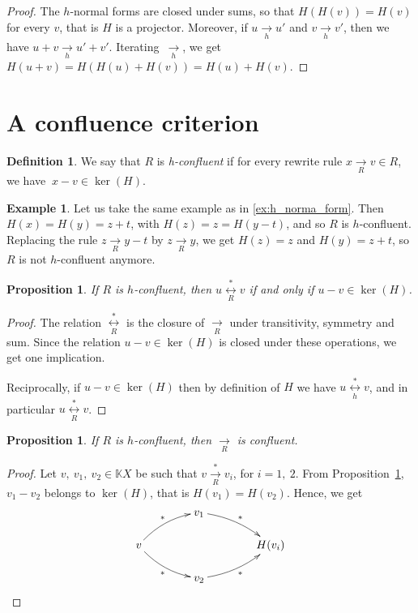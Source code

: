 \documentclass[10pt]{easychair}
\newtheorem{proposition}[theorem]{Proposition}
\theoremstyle{definition}
\newtheorem{definition}[theorem]{Definition}
\newtheorem{example}[theorem]{Example}
\newcommand\K{\mathbb{K}}
\newcommand\KX{\K X}
\newcommand\rewR{\underset{R}{\longrightarrow}}
\newcommand\rewh{\underset{h}{\longrightarrow}}
\newcommand\transR{\overset{*}{\rewR}}
\newcommand\equivR{\underset{R}{\overset{*}{\longleftrightarrow}}}
\newcommand\equivh{\underset{h}{\overset{*}{\longleftrightarrow}}}
\begin{document}
\begin{proof}
  The $h$-normal forms are closed under sums, so that $H(H(v))=H(v)$ for
  every $v$, that is $H$ is a projector. Moreover, if $u \rewh u'$ and
  $v \rewh v'$, then we have $u + v \rewh u' + v'$. Iterating~$\rewh$, we
  get $H(u + v) = H (H(u)+H(v))=H(u)+H(v)$. 
\end{proof}

\section{A confluence criterion}

\begin{definition}\label{def:standardisation_property}
  We say that $R$ is \emph{h-confluent} if for every rewrite rule $x\rewR v\in R$, we have $\ x-v\in\ker(H)$.
\end{definition}

\begin{example}
Let us take the same example as in \ref{ex:h_norma_form}. Then $H(x) = H(y) = z + t$, with $H(z) = z = H(y - t)$, and so $R$ is $h$-confluent. Replacing the rule $z \rewR y - t$ by $z \rewR y$, we get $H(z) = z$ and $H(y) = z + t$, so $R$ is not $h$-confluent anymore. 
\end{example}

\begin{proposition}\label{prop:equationnal_theory}
  If $R$ is $h$-confluent, then
  $u \equivR v$ if and only if $u-v\in\ker(H)$.
\end{proposition}

\begin{proof}
The relation $\equivR$ is the closure of $\rewR$ under transitivity, symmetry and sum. Since the relation $u - v \in \ker(H)$ is closed under these operations, we get one implication.

Reciprocally, if $u - v \in \ker(H)$ then by definition of $H$ we have $u \equivh v$, and in particular $u \equivR v$.
\end{proof}

\begin{proposition}
If $R$ is $h$-confluent, then $\rewR$ is confluent.
\end{proposition}
\begin{proof}
  Let $v,\ v_1,\ v_2\in\KX$ be such that $v\transR v_i$, for $i=1,\ 2$.
  From Proposition~\ref{prop:equationnal_theory}, $v_1-v_2$ belongs to
  $\ker(H)$, that is $H(v_1)=H(v_2)$. Hence, we get
  \[
    \xymatrix @C = 4em @R = 1.5em{
      &
      v_1
      \ar@/^/ [rd] ^{*}
      & \\
      v
      \ar@/^/ [ru] ^{*}
      \ar@/_/ [rd] _{*}
      &
      &
      H(v_i)
      \\
      &
      v_2
      \ar@/_/  [ru] _{*}
      &
    }
  \]
  
\end{proof}
\end{document}
